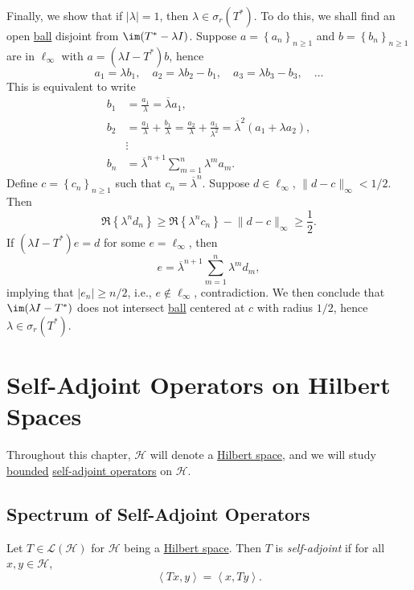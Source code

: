 \begin{eg}
\begin{itemize}
		      Finally, we show that if \(\vert \lambda  \vert = 1\), then \(\lambda \in \sigma _r(T^{\ast} )\). To do this, we shall find an open \hyperref[def:ball]{ball} disjoint from \(\im(T^{\ast} - \lambda I)\). Suppose \(a = \left\{ a_n \right\} _{n\geq 1}\) and \(b = \left\{ b_n \right\} _{n\geq 1}\) are in \(\ell _\infty \) with \(a = (\lambda I-T^{\ast} )b\), hence
		      \[
			      a_1 = \lambda b_1,\quad
			      a_2 = \lambda b_2 - b_1,\quad
			      a_3 = \lambda b_3 - b_3, \quad \ldots
		      \]
		      This is equivalent to write
		      \[
			      \begin{split}
				      b_1 &= \frac{a_1}{\lambda } = \overline{\lambda} a_1, \\
				      b_2 &= \frac{a_1}{\lambda } + \frac{b_1}{\lambda } = \frac{a_2}{\lambda } + \frac{a_1}{\lambda ^{2} } = \overline{\lambda} ^{2} (a_1 + \lambda a_2), \\
				      &\vdots\\
				      b_n &= \overline{\lambda} ^{n+1}\sum_{m=1}^{n} \lambda ^m a_m.
			      \end{split}
		      \]
		      Define \(c = \left\{ c_n \right\} _{n\geq 1}\) such that \(c_n = \overline{\lambda} ^n\). Suppose \(d\in \ell _\infty \), \(\lVert d-c \rVert _\infty < 1/2\). Then
		      \[
			      \Re \left\{ \lambda ^n d_n \right\}
			      \geq \Re \left\{ \lambda ^n c_n \right\} - \lVert d-c \rVert _\infty
			      \geq \frac{1}{2}.
		      \]
		      If \((\lambda I - T^{\ast} ) e = d\) for some \(e = \ell _\infty \), then
		      \[
			      e = \overline{\lambda} ^{n+1} \sum_{m=1}^{n} \lambda ^m d_m,
		      \]
		      implying that \(\vert e_n \vert \geq n / 2\), i.e., \(e \notin \ell _\infty \), contradiction. We then conclude that \(\im(\lambda I - T^{\ast} )\) does not intersect \hyperref[def:ball]{ball} centered at \(c\) with radius \(1 / 2\), hence \(\lambda \in \sigma _r(T^{\ast} )\).
	\end{itemize}
\end{eg}

\chapter{Self-Adjoint Operators on Hilbert Spaces}
Throughout this chapter, \(\mathcal{H} \) will denote a \hyperref[def:Hilbert-space]{Hilbert space}, and we will study \hyperref[rmk:bounded-op]{bounded} \hyperref[def:self-adjoint-op]{self-adjoint operators} on \(\mathcal{H} \).

\section{Spectrum of Self-Adjoint Operators}
\begin{definition}\label{def:self-adjoint-op}
	Let \(T\in \mathcal{L} (\mathcal{H} )\) for \(\mathcal{H} \) being a \hyperref[def:Hilbert-space]{Hilbert space}. Then \(T\) is \emph{self-adjoint} if for all \(x, y\in \mathcal{H} \),
	\[
		\left\langle Tx, y \right\rangle = \left\langle x, Ty \right\rangle.
	\]
\end{definition}

